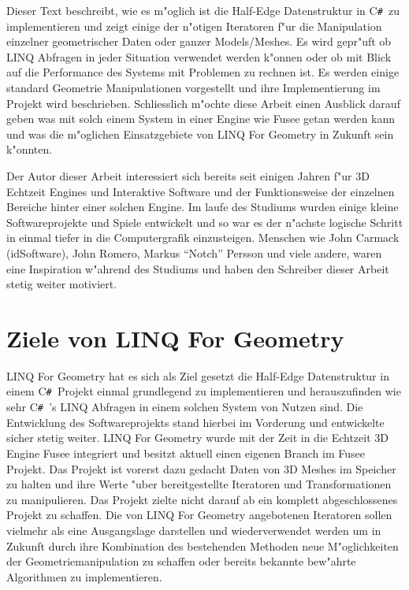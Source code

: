 \documentclass[pagesize, paper=a4, fontsize=12pt,titlepage=true, headings=small, headnosepline, abstractoff, liststotoc, nochapterprefix, plainheadsepline]{scrreprt}
\newcommand{\CSS}{C\texttt{\# }}
\newcommand{\LFG}{LINQ For Geometry}
\newcommand{\LFGS}{LINQ For Geometry }
\newcommand{\LQ}{ LINQ }
\newcommand{\HES}{Half-Edge Datenstruktur }
\begin{document}
Dieser Text beschreibt, wie es m"oglich ist die \HES in \CSS zu implementieren und zeigt einige der n"otigen Iteratoren f"ur die Manipulation einzelner geometrischer Daten oder ganzer Models/Meshes. Es wird gepr"uft ob LINQ Abfragen in jeder Situation verwendet werden k"onnen oder ob mit Blick auf die Performance des Systems mit Problemen zu rechnen ist. Es werden einige standard Geometrie Manipulationen vorgestellt und ihre Implementierung im Projekt wird beschrieben. Schliesslich m"ochte diese Arbeit einen Ausblick darauf geben was mit solch einem System in einer Engine wie Fusee getan werden kann und was die m"oglichen Einsatzgebiete von \LFGS in Zukunft sein k"onnten.
\newline

Der Autor dieser Arbeit interessiert sich bereits seit einigen Jahren f"ur 3D Echtzeit Engines und Interaktive Software und der Funktionsweise der einzelnen Bereiche hinter einer solchen Engine. Im laufe des Studiums wurden einige kleine Softwareprojekte und Spiele entwickelt und so war es der n"achste logische Schritt in einmal tiefer in die Computergrafik einzusteigen. Menschen wie John Carmack (idSoftware), John Romero, Markus "`Notch"' Persson und viele andere, waren eine Inspiration w"ahrend des Studiums und haben den Schreiber dieser Arbeit stetig weiter motiviert.
	
	\section {Ziele von \LFG}
	\LFGS hat es sich als Ziel gesetzt die \HES in einem \CSS Projekt einmal grundlegend zu implementieren und herauszufinden wie sehr \CSS's LINQ Abfragen in einem solchen System von Nutzen sind. Die Entwicklung des Softwareprojekts stand hierbei im Vorderung und entwickelte sicher stetig weiter. \LFGS wurde mit der Zeit in die Echtzeit 3D Engine Fusee integriert und besitzt aktuell einen eigenen Branch im Fusee Projekt. Das Projekt ist vorerst dazu gedacht Daten von 3D Meshes im Speicher zu halten und ihre Werte "uber bereitgestellte Iteratoren und Transformationen zu manipulieren. Das Projekt zielte nicht darauf ab ein komplett abgeschlossenes Projekt zu schaffen. Die von \LFGS angebotenen Iteratoren sollen vielmehr als eine Ausgangslage darstellen und wiederverwendet werden um in Zukunft durch ihre Kombination des bestehenden Methoden neue M"oglichkeiten der Geometriemanipulation zu schaffen oder bereits bekannte bew"ahrte Algorithmen zu implementieren.
\end{document}
